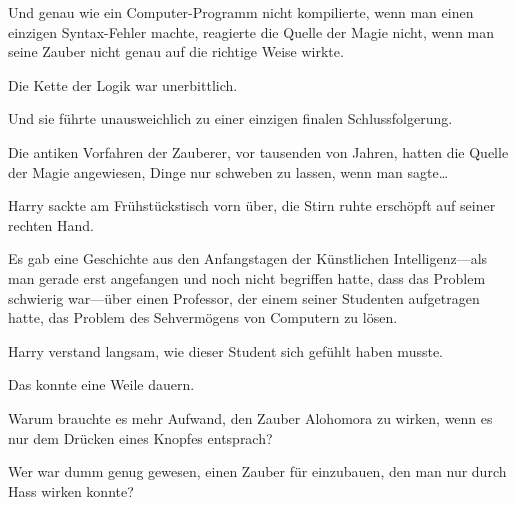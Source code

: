 Und genau wie ein Computer-Programm nicht kompilierte, wenn man einen einzigen Syntax-Fehler machte, reagierte die Quelle der Magie nicht, wenn man seine Zauber nicht genau auf die richtige Weise wirkte.

Die Kette der Logik war unerbittlich.

Und sie führte unausweichlich zu einer einzigen finalen Schlussfolgerung.

Die antiken Vorfahren der Zauberer, vor tausenden von Jahren, hatten die Quelle der Magie angewiesen, Dinge nur schweben zu lassen, wenn man sagte…


Harry sackte am Frühstückstisch vorn über, die Stirn ruhte erschöpft auf seiner rechten Hand.

Es gab eine Geschichte aus den Anfangstagen der Künstlichen Intelligenz—als man gerade erst angefangen und noch nicht begriffen hatte, dass das Problem schwierig war—über einen Professor, der einem seiner Studenten aufgetragen hatte, das Problem des Sehvermögens von Computern zu lösen.

Harry verstand langsam, wie dieser Student sich gefühlt haben musste.

Das konnte eine Weile dauern.

Warum brauchte es mehr Aufwand, den Zauber Alohomora zu wirken, wenn es nur dem Drücken eines Knopfes entsprach?

Wer war dumm genug gewesen, einen Zauber für  einzubauen, den man nur durch Hass wirken konnte?

